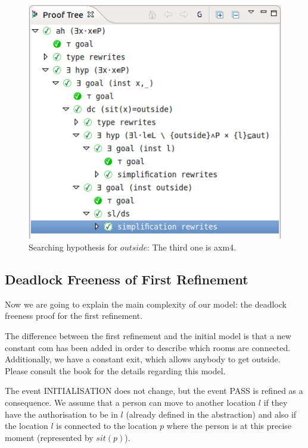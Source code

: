 \begin{figure}[!ht]
  \begin{center}
    \includegraphics{img/tutorial/tut_10_proof_tree_final.png}
    \caption{Searching hypothesis for $outside$: The third one is \textsf{axm4}.}
    \label{fig_tut_10_final_proof_tree}
  \end{center}
\end{figure}



\subsection{Deadlock Freeness of First Refinement}
\label{tut_location_first_refinement}

Now we are going to explain the main complexity of our model: the deadlock freeness proof for the first refinement. 


The difference between the first refinement and the initial model is that a new constant \textsf{com} has been added in order to describe which rooms are connected. Additionally, we have a constant \textsf{exit}, which allows anybody to get outside.  Please consult the book for the details regarding this model.

The event \textsf{INITIALISATION} does not change, but the event \textsf{PASS} is refined as a consequence. We assume that a person can move to another location $l$ if they have the authorisation to be in $l$ (already defined in the abstraction) and also if the location $l$ is connected to the location $p$ where the person is at this precise moment (represented by $sit(p)$).

